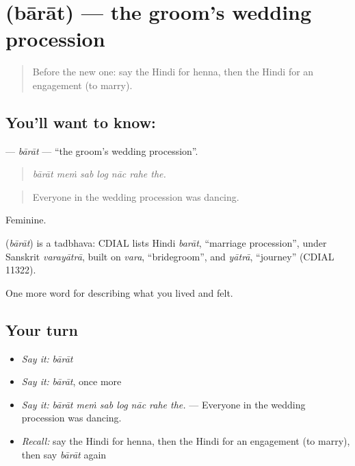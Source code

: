 \section[\texorpdfstring{\hi{बारात} (bārāt)}{बारात (bārāt)}]{ (bārāt) — the groom's wedding procession}

\label{lesson:HI-C500-barat}



\begin{quote}
Before the new one: say the Hindi for henna, then the Hindi for an engagement (to marry).
\end{quote}

\subsection*{You'll want to know: }
\textbf{} — \emph{bārāt} — \textquotedblleft{}the groom's wedding procession\textquotedblright{}.

\begin{quote}
      
\end{quote}

\begin{quote}
\emph{bārāt meṁ sab log nāc rahe the.}
\end{quote}

\begin{quote}
Everyone in the wedding procession was dancing.
\end{quote}

Feminine.

\begin{cousinweb}
\textbf{} (\emph{bārāt}) is a tadbhava: CDIAL lists Hindi \emph{barāt}, \textquotedblleft{}marriage procession\textquotedblright{}, under Sanskrit \emph{varayātrā}, built on \emph{vara}, \textquotedblleft{}bridegroom\textquotedblright{}, and \emph{yātrā}, \textquotedblleft{}journey\textquotedblright{} (CDIAL 11322).
\end{cousinweb}

\begin{grammarlens}[title={What you've built}]
One more word for describing what you lived and felt.
\end{grammarlens}

\subsection*{Your turn}
\begin{itemize}
\raggedright
  \item \emph{Say it:} \emph{bārāt}
  \item \emph{Say it:} \emph{bārāt}, once more
  \item \emph{Say it:} \emph{bārāt meṁ sab log nāc rahe the.} — Everyone in the wedding procession was dancing.
  \item \emph{Recall:} say the Hindi for henna, then the Hindi for an engagement (to marry), then say \emph{bārāt} again
\end{itemize}

